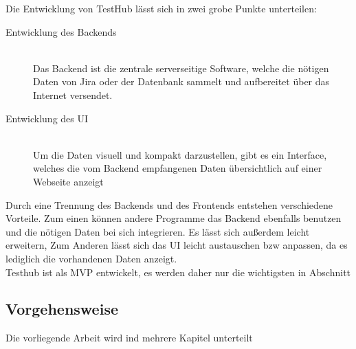 Die Entwicklung von TestHub lässt sich in zwei grobe Punkte unterteilen:

\begin{description}

    \item[Entwicklung des Backends]\hfill \\
    Das Backend ist die zentrale serverseitige Software, welche die nötigen 
    Daten von Jira oder der Datenbank sammelt und aufbereitet über das Internet 
    versendet.
    

    \item[Entwicklung des UI]\hfill \\
    Um die Daten visuell und kompakt darzustellen, gibt es ein Interface, 
    welches die vom Backend empfangenen Daten übersichtlich auf einer Webseite
    anzeigt

\end{description}


Durch eine Trennung des Backends und des \gls{Frontend}s entstehen verschiedene 
Vorteile. Zum einen können andere Programme das Backend ebenfalls benutzen und
die nötigen Daten bei sich integrieren. Es lässt sich außerdem leicht erweitern,
Zum Anderen lässt sich das \gls{UI} leicht austauschen bzw anpassen, da es lediglich 
die vorhandenen Daten anzeigt. \\

Testhub ist als \gls{MVP} entwickelt, es werden daher nur die wichtigsten in 
Abschnitt


\subsection{Vorgehensweise}
Die vorliegende Arbeit wird ind mehrere Kapitel unterteilt

